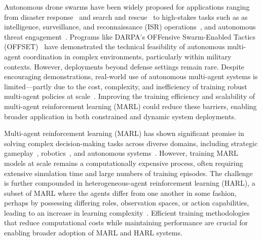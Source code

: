\glsresetall


Autonomous drone swarms have been widely proposed for applications ranging from 
disaster response~\cite{mohddaud2022} and search and rescue~\cite{mohddaud2022} 
to high-stakes tasks such as as intelligence, surveillance, and reconnaissance 
(ISR) operations~\cite{hambling2021}, and autonomous threat 
engagement~\cite{rogers2022, kallenborn2024}. 
Programs like DARPA's OFFensive Swarm-Enabled Tactics (OFFSET)~\cite{zotero-2835} 
have demonstrated the technical feasibility of autonomous multi-agent coordination 
in complex environments, particularly within military contexts. However, 
deployments beyond defense settings remain rare. Despite encouraging demonstrations, 
real-world use of autonomous multi-agent systems is limited—partly due to the cost, 
complexity, and inefficiency of training robust multi-agent policies at scale~\cite{jin2025}. 
Improving the training efficiency and scalability of multi-agent reinforcement 
learning (MARL) could reduce these barriers, enabling broader application in both 
constrained and dynamic system deployments.

Multi-agent reinforcement learning (MARL) has shown significant promise in solving complex 
decision-making tasks across diverse domains, including 
strategic gameplay~\cite{silver2016, vinyals2019, berner2019}, 
robotics~\cite{rizk2019, liang2024}, 
and autonomous systems~\cite{abeywickrama2022}. 
However, training MARL models at scale remains a computationally expensive process, 
often requiring extensive simulation time and large numbers of training episodes. 
The challenge is further compounded in heterogeneous-agent reinforcement learning (HARL), 
a subset of MARL where the agents 
differ from one another in some fashion, perhaps by possessing 
differing roles, observation spaces, 
or action capabilities, leading to an increase in learning complexity~\cite{rizk2019, yang2021a}.
Efficient training methodologies that reduce computational costs while maintaining 
performance are crucial for enabling broader adoption of MARL and HARL systems.

